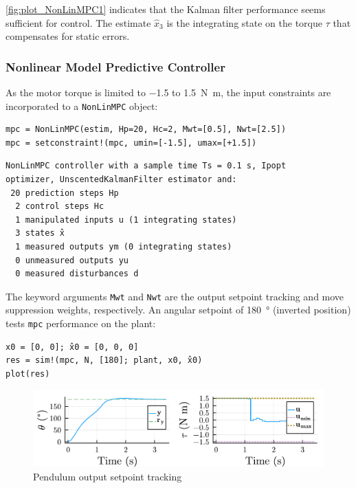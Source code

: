 \cref{fig:plot_NonLinMPC1} indicates that the Kalman filter performance seems sufficient for control. The estimate $\hat{x}_3$ is the integrating state on the torque $\tau$ that compensates for static errors. 

\subsubsection{Nonlinear Model Predictive Controller}

As the motor torque is limited to \num{-1.5} to \SI{1.5}{\newton\meter}, the input constraints are incorporated to a \texttt{NonLinMPC} object:
\begin{verbatim}
mpc = NonLinMPC(estim, Hp=20, Hc=2, Mwt=[0.5], Nwt=[2.5])
mpc = setconstraint!(mpc, umin=[-1.5], umax=[+1.5])
\end{verbatim}

\begin{verbatim}
NonLinMPC controller with a sample time Ts = 0.1 s, Ipopt
optimizer, UnscentedKalmanFilter estimator and:
 20 prediction steps Hp
  2 control steps Hc
  1 manipulated inputs u (1 integrating states)
  3 states x̂
  1 measured outputs ym (0 integrating states)
  0 unmeasured outputs yu
  0 measured disturbances d
\end{verbatim}

The keyword arguments \texttt{Mwt} and \texttt{Nwt} are the output setpoint tracking and move suppression weights, respectively. An angular setpoint of \SI{180}{\degree} (inverted position) tests \texttt{mpc} performance on the plant:
\begin{verbatim}
x0 = [0, 0]; x̂0 = [0, 0, 0]
res = sim!(mpc, N, [180]; plant, x0, x̂0)
plot(res)
\end{verbatim}

\begin{figure}[h]
    \centering
    \includegraphics[width=\columnwidth]{fig/plot_NonLinMPC2.pdf}
    \caption{Pendulum output setpoint tracking}
    \label{fig:plot_NonLinMPC2}
\end{figure}

